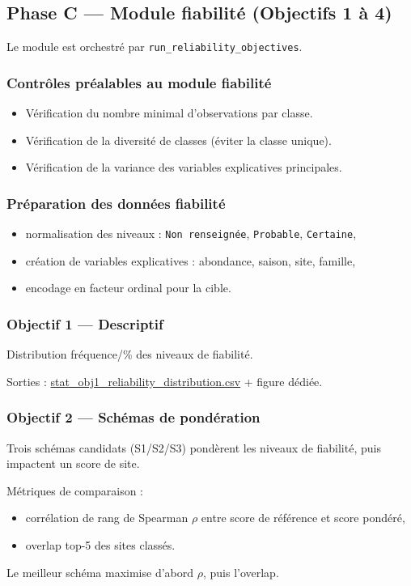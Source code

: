 \documentclass[11pt,a4paper]{article}
\begin{document}
\subsection{Phase C --- Module fiabilit\'e (Objectifs 1 à 4)}
Le module est orchestr\'e par \texttt{run\_reliability\_objectives}.

\subsubsection{Contrôles pr\'ealables au module fiabilit\'e}
\begin{itemize}[leftmargin=1.2cm]
  \item V\'erification du nombre minimal d'observations par classe.
  \item V\'erification de la diversit\'e de classes (\'eviter la classe unique).
  \item V\'erification de la variance des variables explicatives principales.
\end{itemize}

\subsubsection{Pr\'eparation des donn\'ees fiabilit\'e}
\begin{itemize}[leftmargin=1.2cm]
  \item normalisation des niveaux : \texttt{Non renseign\'ee}, \texttt{Probable}, \texttt{Certaine},
  \item cr\'eation de variables explicatives : abondance, saison, site, famille,
  \item encodage en facteur ordinal pour la cible.
\end{itemize}

\subsubsection{Objectif 1 --- Descriptif}
Distribution fr\'equence/\% des niveaux de fiabilit\'e.

Sorties : \url{stat_obj1_reliability_distribution.csv} + figure d\'edi\'ee.

\subsubsection{Objectif 2 --- Sch\'emas de pond\'eration}
Trois sch\'emas candidats (S1/S2/S3) pondèrent les niveaux de fiabilit\'e,
puis impactent un score de site.

M\'etriques de comparaison :
\begin{itemize}[leftmargin=1.2cm]
  \item corr\'elation de rang de Spearman $\rho$ entre score de r\'ef\'erence et score pond\'er\'e,
  \item overlap top-5 des sites class\'es.
\end{itemize}
Le meilleur sch\'ema maximise d'abord $\rho$, puis l'overlap.
\end{document}
